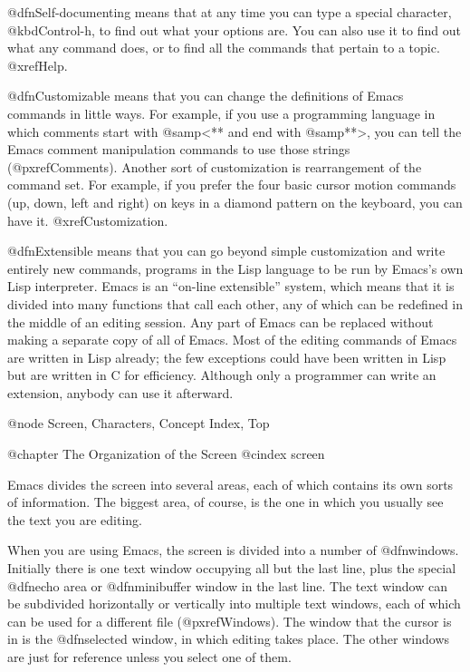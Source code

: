   @dfn{Self-documenting} means that at any time you can type a special
character, @kbd{Control-h}, to find out what your options are.  You can
also use it to find out what any command does, or to find all the commands
that pertain to a topic.  @xref{Help}.

  @dfn{Customizable} means that you can change the definitions of Emacs
commands in little ways.  For example, if you use a programming language in
which comments start with @samp{<**} and end with @samp{**>}, you can tell
the Emacs comment manipulation commands to use those strings
(@pxref{Comments}).  Another sort of customization is rearrangement of the
command set.  For example, if you prefer the four basic cursor motion
commands (up, down, left and right) on keys in a diamond pattern on the
keyboard, you can have it.  @xref{Customization}.

  @dfn{Extensible} means that you can go beyond simple customization and
write entirely new commands, programs in the Lisp language to be run by
Emacs's own Lisp interpreter.  Emacs is an ``on-line extensible'' system,
which means that it is divided into many functions that call each other,
any of which can be redefined in the middle of an editing session.  Any
part of Emacs can be replaced without making a separate copy of all of
Emacs.  Most of the editing commands of Emacs are written in Lisp already;
the few exceptions could have been written in Lisp but are written in C for
efficiency.  Although only a programmer can write an extension, anybody can
use it afterward.

@node Screen, Characters, Concept Index, Top

@chapter The Organization of the Screen
@cindex screen

  Emacs divides the screen into several areas, each of which contains
its own sorts of information.  The biggest area, of course, is the one
in which you usually see the text you are editing.

  When you are using Emacs, the screen is divided into a number of
@dfn{windows}.  Initially there is one text window occupying all but the
last line, plus the special @dfn{echo area} or @dfn{minibuffer window} in
the last line.  The text window can be subdivided horizontally or
vertically into multiple text windows, each of which can be used for a
different file (@pxref{Windows}).  The window that the cursor is in is the
@dfn{selected window}, in which editing takes place.  The other windows are
just for reference unless you select one of them.

